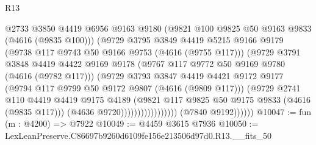 \begin{lexlean}{R13}
\begin{coremodule}
                                      @2733
                                      @3850
                                      @4419
                                      @6956
                                      @9163
                                      @9180
                                      (@9821 @100 @9825 @50 @9163 @9833 (@4616 (@9835 @100)))
                                      (@9729
                                        @3795
                                        @3849
                                        @4419
                                        @5215
                                        @9166
                                        @9179
                                        (@9738 @117 @9743 @50 @9166 @9753 (@4616 (@9755 @117)))
                                        (@9729
                                          @3791
                                          @3848
                                          @4419
                                          @4422
                                          @9169
                                          @9178
                                          (@9767 @117 @9772 @50 @9169 @9780 (@4616 (@9782 @117)))
                                          (@9729
                                            @3793
                                            @3847
                                            @4419
                                            @4421
                                            @9172
                                            @9177
                                            (@9794 @117 @9799 @50 @9172 @9807 (@4616 (@9809 @117)))
                                            (@9729
                                              @2741
                                              @110
                                              @4419
                                              @4419
                                              @9175
                                              @4189
                                              (@9821
                                                @117
                                                @9825
                                                @50
                                                @9175
                                                @9833
                                                (@4616 (@9835 @117)))
                                              (@4636 @9720)))))))))))))))))
              (@7840 @9192))))))
@10047 := fun (m : @4200) => @7922
@10049 := @4459 @3615 @7936
@10050 := LexLeanPreserve.C86697b9260d6109fe156e213506d97d0.R13.__fits_50

\end{coremodule}
\end{lexlean}
